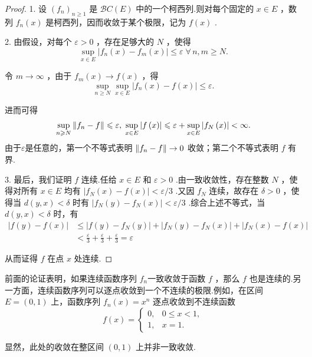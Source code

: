 \begin{proof}
1. 设 ${\left( {f}_{n}\right) }_{n \geq  1}$ 是 $\mathcal{B}C\left( E\right)$ 中的一个柯西列.则对每个固定的 $x \in  E$ ，数列 ${f}_{n}\left( x\right)$ 是柯西列，因而收敛于某个极限，记为 $f\left( x\right)$ .

2. 由假设，对每个 $\varepsilon  > 0$ ，存在足够大的 $N$ ，使得
\[
\mathop{\sup }\limits_{{x \in  E}}\left| {{f}_{n}\left( x\right)  - {f}_{m}\left( x\right) }\right|  \leq  \varepsilon \;\forall\,n,m \geq  N.
\]

令 $m \rightarrow  \infty$ ，由于 ${f}_{m}\left( x\right)  \rightarrow  f\left( x\right)$ ，得
\[
\mathop{\sup }\limits_{{n \geq  N}}\mathop{\sup }\limits_{{x \in  E}}\left| {{f}_{n}\left( x\right)  - f\left( x\right) }\right|  \leq  \varepsilon .
\]

进而可得
\[
\mathop{\sup }\limits_{{n \geqslant  N}}\norm{{f}_{n} - f} \leqslant  \varepsilon ,\;\mathop{\sup }\limits_{{x \in  E}}\left| {f\left( x\right) }\right|  \leqslant  \varepsilon  + \mathop{\sup }\limits_{{x \in  E}}\left| {{f}_{N}\left( x\right) }\right|  < \infty .
\]
由于$\varepsilon$是任意的，第一个不等式表明 $\norm{{f}_{n} - f} \rightarrow  0$ 收敛；第二个不等式表明 $f$ 有界.

3. 最后，我们证明 $f$ 连续.任给 $x \in  E$ 和 $\varepsilon  > 0$ .由一致收敛性，存在整数 $N$ ，使得对所有 $x \in  E$ 均有 $\left| {{f}_{N}\left( x\right)  - f\left( x\right) }\right|  < \varepsilon /3$ .又因 ${f}_{N}$ 连续，故存在 $\delta  > 0$ ，使得当 $d\left( {y,x}\right)  < \delta$ 时有 $\left| {{f}_{N}\left( y\right)  - {f}_{N}\left( x\right) }\right|  < \varepsilon /3$ .综合上述不等式，当 $d\left( {y,x}\right)  < \delta$ 时，有
{\setjot[-2]\begin{align*}
\left| {f\left( y\right)  - f\left( x\right) }\right|  &\leq  \left| {f\left( y\right)  - {f}_{N}\left( y\right) }\right|  + \left| {{f}_{N}\left( y\right)  - {f}_{N}\left( x\right) }\right|  + \left| {{f}_{N}\left( x\right)  - f\left( x\right) }\right|\\
&< \frac{\varepsilon }{3} + \frac{\varepsilon }{3} + \frac{\varepsilon }{3} = \varepsilon
\end{align*}}

从而证得 $f$ 在点 $x$ 处连续.
\end{proof}

\begin{note}[逐点收敛与一致收敛]\label{rem:pointwise-vs-uniform}
前面的论证表明，如果连续函数序列 ${f}_{n}$一致收敛于函数 $f$ ，那么 $f$ 也是连续的.另一方面，连续函数序列可以逐点收敛到一个不连续的极限.例如，在区间 $E = \left(  {0,1}\right)$ 上，函数序列 ${f}_{n}\left( x\right)  = {x}^{n}$ 逐点收敛到不连续函数
\[
f\left( x\right)  =
\begin{cases}
0, & 0 \leq x < 1,\\
1, & x = 1.
\end{cases}
\]

显然，此处的收敛在整区间 $\left(  {0,1}\right)$ 上并非一致收敛.
\end{note}

